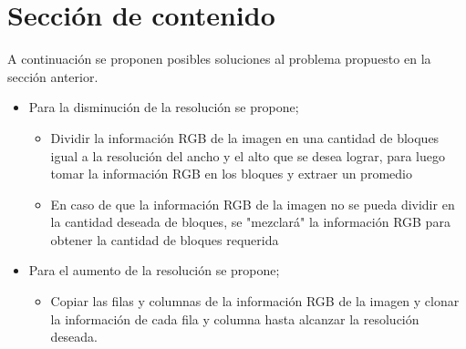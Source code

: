 \documentclass{article}
\begin{document}
	\section{Sección de contenido} \label{contenido}
	A continuación se proponen posibles soluciones al problema propuesto en la sección anterior.
	\begin{itemize}
		\item Para la disminución de la resolución se propone;
		\begin{itemize}
			\item Dividir la información RGB de la imagen en una cantidad de bloques igual a la resolución del ancho y el alto que se desea lograr, para luego tomar la información RGB en los bloques y extraer un promedio
			\item En caso de que la información RGB de la imagen no se pueda dividir en la cantidad  deseada de bloques, se "mezclará" la información RGB para obtener la cantidad de bloques requerida
		\end{itemize}
		\item Para el aumento de la resolución se propone;
		\begin{itemize}
			\item Copiar las filas y columnas de la información RGB de la imagen y clonar la información de cada fila y columna hasta alcanzar la resolución deseada. 
		\end{itemize}
	\end{itemize}
\end{document}
